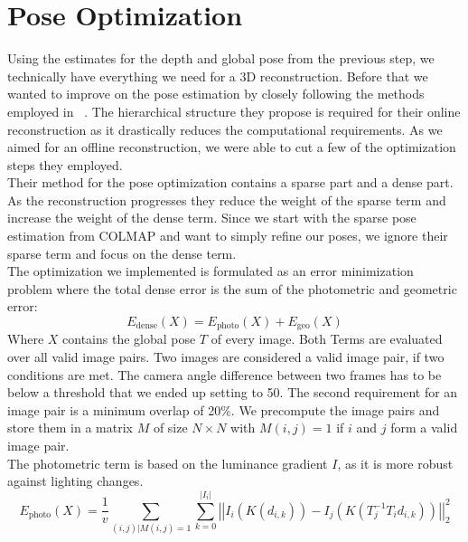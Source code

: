     \section{Pose Optimization}\label{sec:method_pose_optimization}
        Using the estimates for the depth and global pose from the previous step, we technically have everything we need for a 3D reconstruction.
        Before that we wanted to improve on the pose estimation by closely following the methods employed in ~\cite{dai2017bundlefusion}.
        The hierarchical structure they propose is required for their online reconstruction as it drastically reduces the computational requirements.
        As we aimed for an offline reconstruction, we were able to cut a few of the optimization steps they employed.\\
        Their method for the pose optimization contains a sparse part and a dense part.
        As the reconstruction progresses they reduce the weight of the sparse term and increase the weight of the dense term.
        Since we start with the sparse pose estimation from COLMAP and want to simply refine our poses, we ignore their sparse term and focus on the dense term.\\
        The optimization we implemented is formulated as an error minimization problem where the total dense error is the sum of the photometric and geometric error:
        \begin{equation}
            E_{\text{dense}}(X) = E_{\text{photo}}(X) + E_{\text{geo}}(X)
            \label{eq:edense}
        \end{equation}
        Where $X$ contains the global pose $T$ of every image.
        Both Terms are evaluated over all valid image pairs.
        Two images are considered a valid image pair, if two conditions are met.
        The camera angle difference between two frames has to be below a threshold that we ended up setting to 50\textdegree.
        The second requirement for an image pair is a minimum overlap of 20\%.
        We precompute the image pairs and store them in a matrix $M$ of size $N \times N$ with $M(i,j) = 1$ if $i$ and $j$ form a valid image pair.\\
        The photometric term is based on the luminance gradient $I$, as it is more robust against lighting changes.
        \begin{equation}
            E_{\text{photo}}(X) =
            \frac{1}{v} \sum_{(i,j) | M(i,j)=1}\sum_{k=0}^{\left\lvert I_i \right\rvert}
            \left\lvert\left\lvert
            I_i(K(d_{i,k})) - I_j(K(T_j^{-1}T_id_{i,k}))
            \right\rvert\right\rvert_2^2
            \label{eq:ephoto}
        \end{equation}
